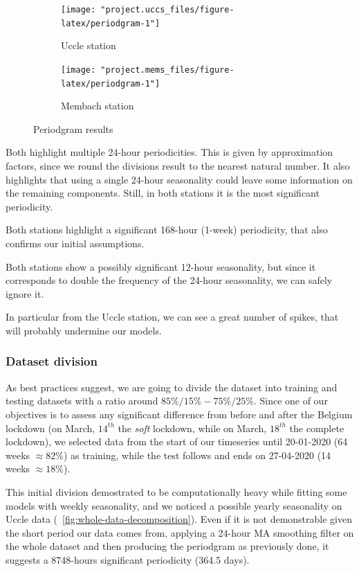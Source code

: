 \documentclass[12pt]{article}
\begin{document}
\begin{figure}[h]
	\begin{subfigure}{.5\linewidth}
		\texttt{[image: "project.uccs\_files/figure-latex/periodgram-1"]}
		\caption{Uccle station}
		\label{fig:periodgram:uccs}
	\end{subfigure}
	\begin{subfigure}{.5\linewidth}
		\texttt{[image: "project.mems\_files/figure-latex/periodgram-1"]}
		\caption{Membach station}
		\label{fig:periodgram:mems}
	\end{subfigure}
	\caption{Periodgram results}
	\label{fig:periodgram}
\end{figure}

Both highlight multiple 24-hour periodicities. This is given by approximation factors, since we round the divisions result to the nearest natural number. It also highlights that using a single 24-hour seasonality could leave some information on the remaining components. Still, in both stations it is the most significant periodicity.

Both stations highlight a significant 168-hour (1-week) periodicity, that also confirms our initial assumptions.

Both stations show a possibly significant 12-hour seasonality, but since it corresponds to double the frequency of the 24-hour seasonality, we can safely ignore it.

In particular from the Uccle station, we can see a great number of spikes, that will probably undermine our models.


\subsubsection{Dataset division}
As best practices suggest, we are going to divide the dataset into training and testing datasets with a ratio around $85\%/15\% - 75\%/25\%$.
Since one of our objectives is to assess any significant difference from before and after the Belgium lockdown (on March, $14^{th}$ the \textit{soft} lockdown, while on March, $18^{th}$ the complete lockdown), we selected data from the start of our timeseries until 20-01-2020 (64 weeks $\approx 82\%$) as training, while the test follows and ends on 27-04-2020 (14 weeks $\approx 18\%$).

This initial division demostrated to be computationally heavy while fitting some models with weekly seasonality, and we noticed a possible yearly seasonality on Uccle data (\figurename~\ref{fig:whole-data-decomposition}). Even if it is not demonstrable given the short period our data comes from, applying a 24-hour MA smoothing filter on the whole dataset and then producing the periodgram as previously done, it suggests a 8748-hours significant periodicity (364.5 days).
\end{document}

